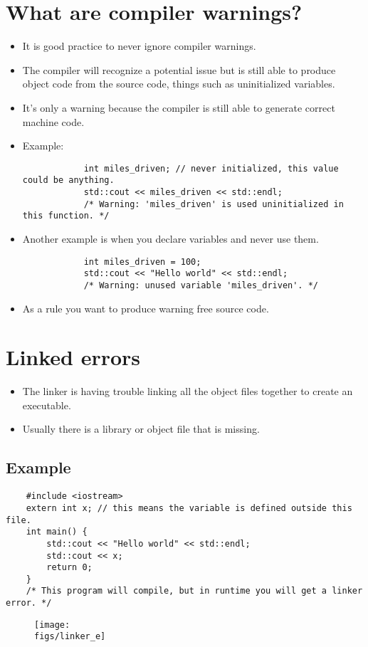 \section{What are compiler warnings?}
\begin{itemize}
    \item It is good practice to never ignore compiler warnings.
    \item The compiler will recognize a potential issue but is still able to produce object code from the source code, things such as uninitialized variables.
    \item It's only a warning because the compiler is still able to generate correct machine code.
    \item Example: 
        \begin{verbatim}
            int miles_driven; // never initialized, this value could be anything.
            std::cout << miles_driven << std::endl;
            /* Warning: 'miles_driven' is used uninitialized in this function. */
        \end{verbatim}
    
    \item Another example is when you declare variables and never use them.
        \begin{verbatim}
            int miles_driven = 100; 
            std::cout << "Hello world" << std::endl;
            /* Warning: unused variable 'miles_driven'. */
        \end{verbatim}
    
    \item As a rule you want to produce warning free source code.
\end{itemize}


\section{Linked errors}
\begin{itemize}
    \item The linker is having trouble linking all the object files together to create an executable.
    \item Usually there is a library or object file that is missing.
\end{itemize}
\subsection{Example}
\begin{verbatim}
    #include <iostream>
    extern int x; // this means the variable is defined outside this file.
    int main() {
        std::cout << "Hello world" << std::endl;
        std::cout << x;
        return 0;
    }
    /* This program will compile, but in runtime you will get a linker error. */
\end{verbatim}
\begin{figure}[H]
    \centering
    \texttt{[image: \\figs/linker\_e]}
\end{figure}

